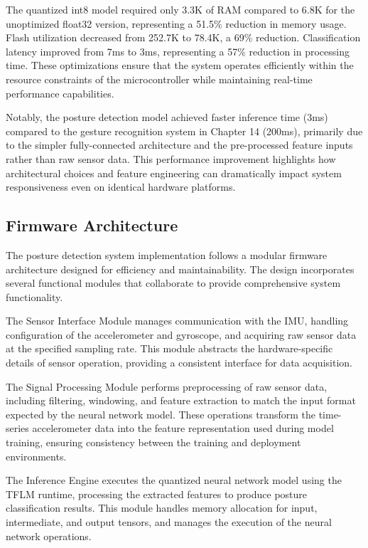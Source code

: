 \documentclass[
  9pt,
  letterpaper,
  abstract,
  titlepage]{scrbook}
\begin{document}
The quantized int8 model required only 3.3K of RAM compared to 6.8K for
the unoptimized float32 version, representing a 51.5\% reduction in
memory usage. Flash utilization decreased from 252.7K to 78.4K, a 69\%
reduction. Classification latency improved from 7ms to 3ms, representing
a 57\% reduction in processing time. These optimizations ensure that the
system operates efficiently within the resource constraints of the
microcontroller while maintaining real-time performance capabilities.

Notably, the posture detection model achieved faster inference time
(3ms) compared to the gesture recognition system in Chapter 14 (200ms),
primarily due to the simpler fully-connected architecture and the
pre-processed feature inputs rather than raw sensor data. This
performance improvement highlights how architectural choices and feature
engineering can dramatically impact system responsiveness even on
identical hardware platforms.

\subsection{Firmware Architecture}\label{firmware-architecture}

The posture detection system implementation follows a modular firmware
architecture designed for efficiency and maintainability. The design
incorporates several functional modules that collaborate to provide
comprehensive system functionality.

The Sensor Interface Module manages communication with the IMU, handling
configuration of the accelerometer and gyroscope, and acquiring raw
sensor data at the specified sampling rate. This module abstracts the
hardware-specific details of sensor operation, providing a consistent
interface for data acquisition.

The Signal Processing Module performs preprocessing of raw sensor data,
including filtering, windowing, and feature extraction to match the
input format expected by the neural network model. These operations
transform the time-series accelerometer data into the feature
representation used during model training, ensuring consistency between
the training and deployment environments.

The Inference Engine executes the quantized neural network model using
the TFLM runtime, processing the extracted features to produce posture
classification results. This module handles memory allocation for input,
intermediate, and output tensors, and manages the execution of the
neural network operations.
\end{document}
